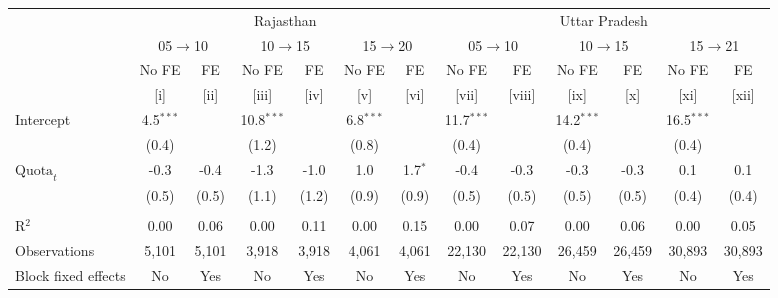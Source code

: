 
\begingroup
\centering
\scriptsize
\begin{adjustbox}{max width=\linewidth}
   \begin{threeparttable}[b]
      \begin{tabular}{lcccccccccccc}
         \toprule
          & \multicolumn{6}{c}{Rajasthan} & \multicolumn{6}{c}{Uttar Pradesh} \\
          & \multicolumn{2}{c}{05$\rightarrow$10} & \multicolumn{2}{c}{10$\rightarrow$15} & \multicolumn{2}{c}{15$\rightarrow$20} & \multicolumn{2}{c}{05$\rightarrow$10} & \multicolumn{2}{c}{10$\rightarrow$15} & \multicolumn{2}{c}{15$\rightarrow$21} \\
                             & No FE       & FE    & No FE        & FE    & No FE       & FE        & No FE        & FE     & No FE        & FE     & No FE        & FE \\
                             & [i]         & [ii]  & [iii]        & [iv]  & [v]         & [vi]      & [vii]        & [viii] & [ix]         & [x]    & [xi]         & [xii]\\
         \midrule
         Intercept           & 4.5$^{***}$ &       & 10.8$^{***}$ &       & 6.8$^{***}$ &           & 11.7$^{***}$ &        & 14.2$^{***}$ &        & 16.5$^{***}$ &   \\
                             & (0.4)       &       & (1.2)        &       & (0.8)       &           & (0.4)        &        & (0.4)        &        & (0.4)        &   \\
         $\text{Quota}_{t}$  & -0.3        & -0.4  & -1.3         & -1.0  & 1.0         & 1.7$^{*}$ & -0.4         & -0.3   & -0.3         & -0.3   & 0.1          & 0.1\\
                             & (0.5)       & (0.5) & (1.1)        & (1.2) & (0.9)       & (0.9)     & (0.5)        & (0.5)  & (0.5)        & (0.5)  & (0.4)        & (0.4)\\
          \\
         R$^2$               & 0.00        & 0.06  & 0.00         & 0.11  & 0.00        & 0.15      & 0.00         & 0.07   & 0.00         & 0.06   & 0.00         & 0.05\\
         Observations        & 5,101       & 5,101 & 3,918        & 3,918 & 4,061       & 4,061     & 22,130       & 22,130 & 26,459       & 26,459 & 30,893       & 30,893\\
         Block fixed effects & No          & Yes   & No           & Yes   & No          & Yes       & No           & Yes    & No           & Yes    & No           & Yes\\
         \bottomrule
      \end{tabular}


\end{threeparttable}
\end{adjustbox}
